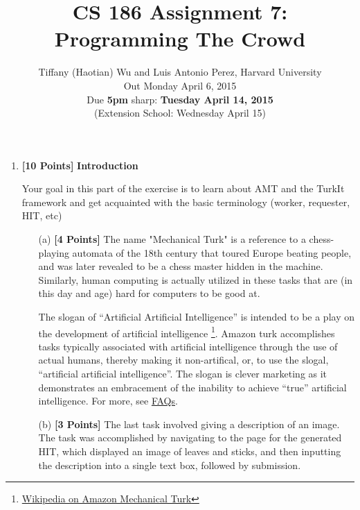 \documentclass[11pt]{article}
\newcommand{\points}[1]{\textbf{[#1 Points]}}
\begin{document}
\title{CS 186 Assignment 7:\\
Programming The Crowd}
\author{Tiffany (Haotian) Wu and Luis Antonio Perez, Harvard University\\
Out Monday April 6, 2015\\
Due {\bf 5pm} sharp: {\bf Tuesday April 14, 2015}\\
(Extension School: Wednesday April 15)
}
\date{}

\maketitle

\smallskip

\begin{enumerate}
\item \points{10} {\bf Introduction}

Your goal in this part of the exercise is to learn about AMT and the TurkIt framework
and get acquainted with the basic terminology (worker, requester, HIT, etc)
\begin{enumerate}

\item[(a)] \points{4} 
The name "Mechanical Turk" is a reference to a chess-playing automata of the 18th century that toured Europe beating people, and was later revealed to be a chess master hidden in the machine. Similarly, human computing is actually utilized in these tasks that are (in this day and age) hard for computers to be good at.

The slogan of ``Artificial Artificial Intelligence'' is intended to be a play on the development of artificial intelligence \footnote{\href{http://en.wikipedia.org/wiki/Amazon_Mechanical_Turk}{Wikipedia on Amazon Mechanical Turk}}. Amazon turk accomplishes tasks typically associated with artificial intelligence through the use of actual humans, thereby making it non-artifical, or, to use the slogal, ``artificial artificial intelligence''. The slogan is clever marketing as it demonstrates an embracement of the inability to achieve ``true'' artificial intelligence. For more, see \href{https://www.mturk.com/mturk/help?helpPage=main}{FAQs}.

%
\item[(b)] \points{3} 
The last task involved giving a description of an image. The task was accomplished by navigating to the page for the generated HIT, which displayed an image of leaves and sticks, and then inputting the description into a single text box, followed by submission.


\end{enumerate}
\end{enumerate}
\end{document}
